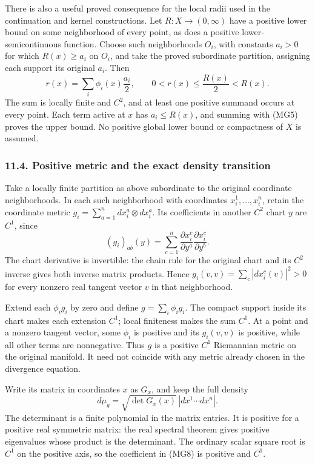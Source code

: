 \documentclass[
  11pt,
]{article}
\begin{document}
There is also a useful proved consequence for the local radii used in
the continuation and kernel constructions. Let \(R:X\to(0,\infty)\) have
a positive lower bound on some neighborhood of every point, as does a
positive lower-semicontinuous function. Choose such neighborhoods
\(O_i\), with constants \(a_i>0\) for which \(R(x)\geq a_i\) on \(O_i\),
and take the proved subordinate partition, assigning each support its
original \(a_i\). Then \[
 r(x)=\sum_i\phi_i(x)\frac{a_i}{2},\qquad
 0<r(x)\leq\frac{R(x)}2<R(x).
                                                               \tag{MG7}
\] The sum is locally finite and \(C^2\), and at least one positive
summand occurs at every point. Each term active at \(x\) has
\(a_i\leq R(x)\), and summing with (MG5) proves the upper bound. No
positive global lower bound or compactness of \(X\) is assumed.

\subsubsection{11.4. Positive metric and the exact density
transition}\label{positive-metric-and-the-exact-density-transition}

Take a locally finite partition as above subordinate to the original
coordinate neighborhoods. In each such neighborhood with coordinates
\(x_i^1,\ldots,x_i^n\), retain the coordinate metric
\(g_i=\sum_{a=1}^n dx_i^a\otimes dx_i^a\). Its coefficients in another
\(C^2\) chart \(y\) are \(C^1\), since \[
 (g_i)_{ab}(y)
   =\sum_{c=1}^n
        \frac{\partial x_i^c}{\partial y^a}
        \frac{\partial x_i^c}{\partial y^b}.
\] The chart derivative is invertible: the chain rule for the original
chart and its \(C^2\) inverse gives both inverse matrix products. Hence
\(g_i(v,v)=\sum_c|dx_i^c(v)|^2>0\) for every nonzero real tangent vector
\(v\) in that neighborhood.

Extend each \(\phi_i g_i\) by zero and define \(g=\sum_i\phi_i g_i\).
The compact support inside its chart makes each extension \(C^1\); local
finiteness makes the sum \(C^1\). At a point and a nonzero tangent
vector, some \(\phi_i\) is positive and its \(g_i(v,v)\) is positive,
while all other terms are nonnegative. Thus \(g\) is a positive \(C^1\)
Riemannian metric on the original manifold. It need not coincide with
any metric already chosen in the divergence equation.

Write its matrix in coordinates \(x\) as \(G_x\), and keep the full
density \[
 d\mu_g=\sqrt{\det G_x(x)}\,|dx^1\cdots dx^n|.
                                                               \tag{MG8}
\] The determinant is a finite polynomial in the matrix entries. It is
positive for a positive real symmetric matrix: the real spectral theorem
gives positive eigenvalues whose product is the determinant. The
ordinary scalar square root is \(C^1\) on the positive axis, so the
coefficient in (MG8) is positive and \(C^1\).
\end{document}
